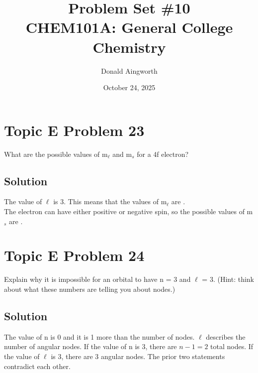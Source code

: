 \documentclass[10pt]{article}
\title{
    Problem Set \#10
    \\  \small
    CHEM101A: General College Chemistry
    }
\author{Donald Aingworth}
\date{October 24, 2025}
\begin{document}

    \maketitle

    \setcounter{section}{22}

    \pagebreak
    \section{Topic E Problem 23}
        What are the possible values of m$_\ell$ and m$_s$ for a 4f electron?
        
        \subsection{Solution}
            The value of $\ell$ is 3.
            This means that the values of m$_\ell$ are .\\
            The electron can have either positive or negative spin, so the possible values of m$_s$ are .

    \section{Topic E Problem 24}
        Explain why it is impossible for an orbital to have n = 3 and $\ell$ = 3. 
        (Hint: think about what these numbers are telling you about nodes.)

        \subsection{Solution}
            The value of n is 0 and it is 1 more than the number of nodes.
            $\ell$ describes the number of angular nodes.
            If the value of n is 3, there are $n - 1 = 2$ total nodes.
            If the value of $\ell$ is 3, there are 3 angular nodes.
            The prior two statements contradict each other.

    \pagebreak
\end{document}
